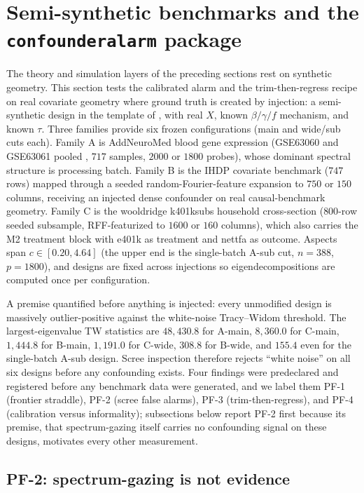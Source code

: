 \section{Semi-synthetic benchmarks and the \texttt{confounderalarm} package}
\label{sec:benchmarks}

The theory and simulation layers of the preceding sections rest on synthetic geometry. This section tests the calibrated alarm and the trim-then-regress recipe on real covariate geometry where ground truth is created by injection: a semi-synthetic design in the template of \citet{ulmer2025sdforest}, with real $X$, known $\beta/\gamma/f$ mechanism, and known $\tau$. Three families provide six frozen configurations (main and wide/sub cuts each). Family A is AddNeuroMed blood gene expression (GSE63060 and GSE63061 pooled \citep{geo_gse63060,geo_gse63061}, $717$ samples, $2000$ or $1800$ probes), whose dominant spectral structure is processing batch. Family B is the IHDP covariate benchmark \citep{hill2011bayesian} ($747$ rows) mapped through a seeded random-Fourier-feature expansion to $750$ or $150$ columns, receiving an injected dense confounder on real causal-benchmark geometry. Family C is the wooldridge k401ksubs household cross-section \citep{wooldridge2016introductory} ($800$-row seeded subsample, RFF-featurized to $1600$ or $160$ columns), which also carries the M2 treatment block with e401k as treatment and nettfa as outcome. Aspects span $c \in [0.20, 4.64]$ (the upper end is the single-batch A-sub cut, $n=388$, $p=1800$), and designs are fixed across injections so eigendecompositions are computed once per configuration.

A premise quantified before anything is injected: every unmodified design is massively outlier-positive against the white-noise Tracy--Widom threshold. The largest-eigenvalue TW statistics are $48{,}430.8$ for A-main, $8{,}360.0$ for C-main, $1{,}444.8$ for B-main, $1{,}191.0$ for C-wide, $308.8$ for B-wide, and $155.4$ even for the single-batch A-sub design. Scree inspection therefore rejects ``white noise'' on all six designs before any confounding exists. Four findings were predeclared and registered before any benchmark data were generated, and we label them PF-1 (frontier straddle), PF-2 (scree false alarms), PF-3 (trim-then-regress), and PF-4 (calibration versus informality); subsections below report PF-2 first because its premise, that spectrum-gazing itself carries no confounding signal on these designs, motivates every other measurement.

\subsection*{PF-2: spectrum-gazing is not evidence}

